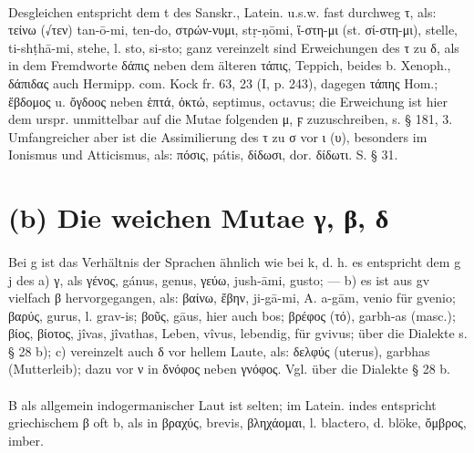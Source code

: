 \paragraph{}Desgleichen entspricht dem t des Sanskr., Latein. u.s.w. fast
durchweg τ, als: τείνω (√τεν)  tan-ō-mi,  ten-do, στρών-νυμι, 
stṛ-ṇōmi, ἵ-στη-μι (st. σί-στη-μι), stelle,  ti-shṭhā-mi, stehe, l.
sto, si-sto; ganz vereinzelt sind Erweichungen des τ zu δ, als in dem Fremdworte
δάπις neben dem älteren τάπις, Teppich, beides b. Xenoph., δάπιδας auch Hermipp.
com. Kock fr. 63, 23 (I, p. 243), dagegen τάπης Hom.; ἕβδομος u. ὄγδοος neben
ἑπτά, ὀκτώ,  septimus, octavus; die Erweichung ist hier dem urspr. unmittelbar
auf die Mutae folgenden μ, ϝ zuzuschreiben, s. § 181, 3. Umfangreicher aber ist
die Assimilierung des τ zu σ vor ι (υ), besonders im Ionismus und Atticismus,
als: πόσις,  pátis, δίδωσι, dor. δίδωτι. S. § 31.

\section{(b) Die weichen Mutae γ, β, δ}


\paragraph{} Bei g ist das Verhältnis der Sprachen ähnlich wie bei k, d. h. es
entspricht dem g j des  a)  γ, als γένος,  gánus,  genus, γεύω,
 jush-āmi,  gusto; — b) es ist aus gv vielfach β hervorgegangen, als:
βαίνω, ἔβην,  ji-gā-mi, A. a-gām,  venio für gvenio; βαρύς,  gurus, l.
grav-is; βοῦς,  gāus, hier auch  bos; βρέφος (τό),  garbh-as (masc.);
βίος, βίοτος,  jîvas, jîvathas, Leben,  vîvus, lebendig, für gvivus; über
die Dialekte s. § 28 b); c) vereinzelt auch δ vor hellem Laute, als: δελφύς
(uterus),  garbhas (Mutterleib); dazu vor ν in δνόφος neben γνόφος. Vgl. über
die Dialekte § 28 b. 
\paragraph{} B als allgemein indogermanischer Laut ist selten; im Latein. indes
entspricht griechischem β oft b, als in βραχύς,  brevis, βληχάομαι, l.
blactero, d. blöke, ὄμβρος,  imber. 

